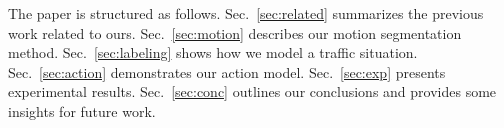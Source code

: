 

The paper is structured as follows. Sec.~\ref{sec:related}
summarizes the previous work related to ours. Sec.~\ref{sec:motion}
describes our motion segmentation method. Sec.~\ref{sec:labeling}
shows how we model a traffic situation. Sec.~\ref{sec:action} demonstrates
our action model. Sec.~\ref{sec:exp} presents experimental results.
Sec.~\ref{sec:conc} outlines our conclusions and provides some insights for
future work.
